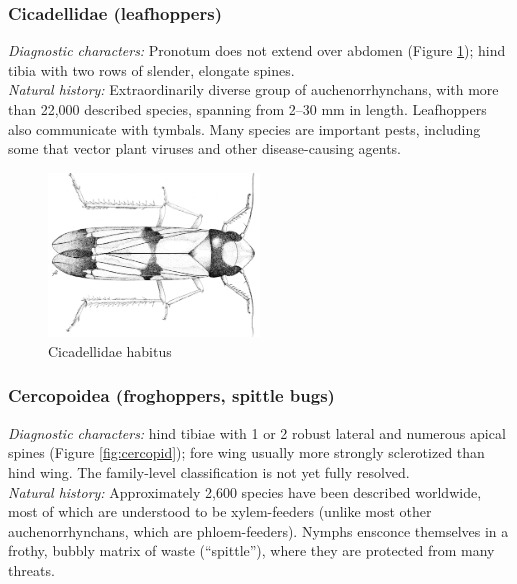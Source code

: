 \documentclass[letterpaper, 11pt]{article}
\begin{document}
\subsubsection{Cicadellidae (leafhoppers)}
\noindent{}\textit{Diagnostic characters:} Pronotum does not extend over abdomen (Figure \ref{fig:cicadellids}); hind tibia with two rows of slender, elongate spines.\\

\noindent{}\textit{Natural history:} Extraordinarily diverse group of auchenorrhynchans, with more than 22,000 described species, spanning from 2--30 mm in length. Leafhoppers also communicate with tymbals. Many species are important pests, including some that vector plant viruses and other disease-causing agents.\\


\begin{figure}[ht!]
 \centering
  \includegraphics[width=0.5\textwidth]{cicadellidHabitus.png}
  \caption{Cicadellidae habitus \citep[][Plate I]{runner1923three}}
 \label{fig:cicadellids}
\end{figure}

\subsubsection{Cercopoidea (froghoppers, spittle bugs)}
\noindent{}\textit{Diagnostic characters:} hind tibiae with 1 or 2 robust lateral and numerous apical spines (Figure \ref{fig:cercopid}); fore wing usually more strongly sclerotized than hind wing. The family-level classification is not yet fully resolved.\\

\noindent{}\textit{Natural history:} Approximately 2,600 species have been described worldwide, most of which are understood to be xylem-feeders (unlike most other auchenorrhynchans, which are phloem-feeders). Nymphs ensconce themselves in a frothy, bubbly matrix of waste (``spittle''), where they are protected from many threats.\\
\end{document}
